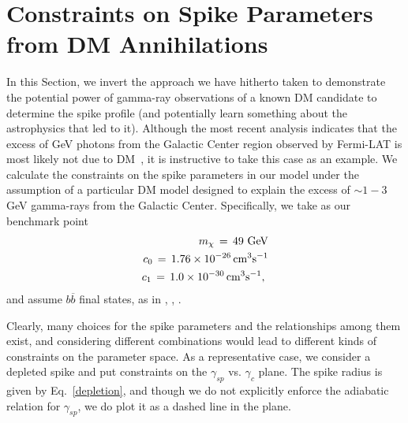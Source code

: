 \documentclass[11pt]{article}
\newcommand{\be}{\begin{equation}}
\newcommand{\ee}{\end{equation}}
\newcommand{\bea}{\begin{eqnarray}}
\newcommand{\eea}{\end{eqnarray}}
\begin{document}
%
%


\section{Constraints on Spike Parameters from DM Annihilations} \label{spikeconstras}

In this Section, we invert the approach we have hitherto taken to demonstrate the potential power of gamma-ray observations of a known DM candidate to determine the spike profile (and potentially learn something about the astrophysics that led to it). Although the most recent analysis indicates that the excess of GeV photons from the Galactic Center region observed by Fermi-LAT is most likely not due to DM~\cite{TheFermi-LAT:2017vmf}, it is instructive to take this case as an example. We calculate the constraints on the spike parameters in our model under the assumption of a particular DM model designed to explain the excess of $\sim 1-3$ GeV gamma-rays from the Galactic Center. Specifically, we take as our benchmark point 
%
\bea
m_{\chi} \, = \, 49 \,\, {\rm GeV} \nonumber \\ 
c_0 \, = \, 1.76 \times 10^{-26} \, {\rm cm}^{3} {\rm s}^{-1} \nonumber \\
c_1 \, = \, 1.0 \times 10^{-30} \, {\rm cm}^{3} {\rm s}^{-1}, \,\,
\label{GCcandidate}
\eea
%
and assume $b \overline{b}$ final states, as in \cite{TheFermi-LAT:2015kwa}, \cite{Karwin:2016tsw}, \cite{Daylan:2014rsa}.

Clearly, many choices for the spike parameters and the relationships among them exist, and considering different combinations would lead to different kinds of constraints on the parameter space. As a representative case, we consider a depleted spike and put constraints on the $\gamma_{sp}$ vs. $\gamma_c$ plane. The spike radius is given by Eq.~\ref{depletion}, and though we do not explicitly enforce the adiabatic relation for $\gamma_{sp}$, we do plot it as a dashed line in the plane.
\end{document}

